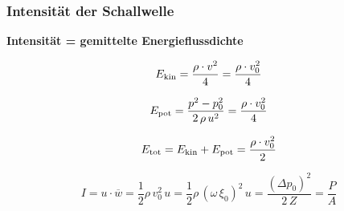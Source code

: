 \subsubsection{Intensität der Schallwelle}

\textbf{Intensität = gemittelte Energieflussdichte}

\begin{minipage}{0.48\columnwidth}
    $$ E_{\rm kin} = \frac{\rho \cdot v^2}{4} = \frac{\rho \cdot v_0^2}{4} $$
\end{minipage}
\hfill
\begin{minipage}{0.48\columnwidth}
    $$ E_{\rm pot} = \frac{p^2 - p_0^2}{2 \, \rho \, u^2} = \frac{\rho \cdot v_0^2}{4} $$
\end{minipage}

$$ E_{\rm tot} = E_{\rm kin} + E_{\rm pot} = \frac{\rho \cdot v_0^2}{2} $$

$$ \boxed{ I = u \cdot \overline{w} = \frac{1}{2} \rho \, v_0^2 \, u  =  \frac{1}{2} \rho \, (\omega \, \xi_0)^2  \, u = \frac{( \Delta p_0)^2}{2 \, Z} = \frac{P}{A} } $$


